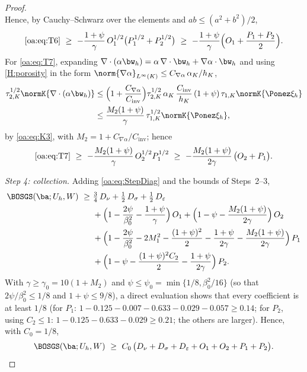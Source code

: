 \begin{proof}
\[\]
Hence, by Cauchy--Schwarz over the elements and $ab \le (a^2+b^2)/2$,
\[
  \text{\cref{oa:eq:T6}}
  \ \ge\ -\frac{1+\psi}{\gamma}\, O_1^{1/2}\bigl( P_1^{1/2} + P_2^{1/2} \bigr)
  \ \ge\ -\frac{1+\psi}{\gamma}\Bigl( O_1 + \frac{P_1 + P_2}{2} \Bigr).
\]
For \cref{oa:eq:T7}, expanding
$\nabla\cdot(\alpha\bw_h) = \alpha\,\nabla\cdot\bw_h + \nabla\alpha\cdot\bw_h$ and
using \cref{H:porosity} in the form
$\norm{\nabla\alpha}_{L^\infty(K)} \le C_{\nabla\alpha}\,\alpha_K/h_K$,
\[
\begin{aligned}
  \tau_{2,K}^{1/2}\normK{\nabla\cdot(\alpha\bw_h)}
  &\le \Bigl(1 + \frac{C_{\nabla\alpha}}{C_{\mathrm{inv}}}\Bigr)
  \tau_{2,K}^{1/2}\,\alpha_K\,\frac{C_{\mathrm{inv}}}{h_K}\,
  (1+\psi)\,\tau_{1,K}\normK{\Ponez\xi_h} \\
  &\le \frac{M_2(1+\psi)}{\gamma}\,\tau_{1,K}^{1/2}\normK{\Ponez\xi_h},
\end{aligned}
\]
by \cref{oa:eq:K3}, with $M_2 = 1 + C_{\nabla\alpha}/C_{\mathrm{inv}}$; hence
\[
  \text{\cref{oa:eq:T7}}
  \ \ge\ -\frac{M_2(1+\psi)}{\gamma}\, O_2^{1/2} P_1^{1/2}
  \ \ge\ -\frac{M_2(1+\psi)}{2\gamma}\,\bigl( O_2 + P_1 \bigr).
\]

\medskip\noindent\emph{Step 4: collection.}
Adding \cref{oa:eq:StepDiag} and the bounds of Steps~2--3,
\begin{align*}
  \BOSGS(\ba; U_h, W)
  \ \ge\ & \tfrac34\, D_\nu + \tfrac12\, D_\sigma + \tfrac12\, D_\varepsilon\\
  &+ \Bigl( 1 - \frac{2\psi}{\beta_0^2} - \frac{1+\psi}{\gamma} \Bigr)\, O_1
  + \Bigl( 1 - \psi - \frac{M_2(1+\psi)}{2\gamma} \Bigr)\, O_2\\
  &+ \Bigl( 1 - \frac{2\psi}{\beta_0^2} - 2M_1^2 - \frac{(1+\psi)^2}{2}
  - \frac{1+\psi}{2\gamma} - \frac{M_2(1+\psi)}{2\gamma} \Bigr)\, P_1\\
  &+ \Bigl( 1 - \psi - \frac{(1+\psi)^2 C_2}{2} - \frac{1+\psi}{2\gamma} \Bigr)\, P_2 .
\end{align*}
With $\gamma \ge \gamma_0 = 10(1+M_2)$ and
$\psi \le \psi_0 = \min\{1/8, \beta_0^2/16\}$ (so that $2\psi/\beta_0^2 \le 1/8$ and
$1+\psi \le 9/8$), a direct evaluation shows that every coefficient is at least
$1/8$ (for $P_1$: $1 - 0.125 - 0.007 - 0.633 - 0.029 - 0.057 \ge 0.14$; for $P_2$,
using $C_2 \le 1$: $1 - 0.125 - 0.633 - 0.029 \ge 0.21$; the others are larger).
Hence, with $C_0 = 1/8$,
\begin{equation}
  \label{oa:eq:Collected}
  \BOSGS(\ba; U_h, W)
  \ \ge\ C_0\,\bigl( D_\nu + D_\sigma + D_\varepsilon + O_1 + O_2 + P_1 + P_2 \bigr).
\end{equation}


\end{proof}
